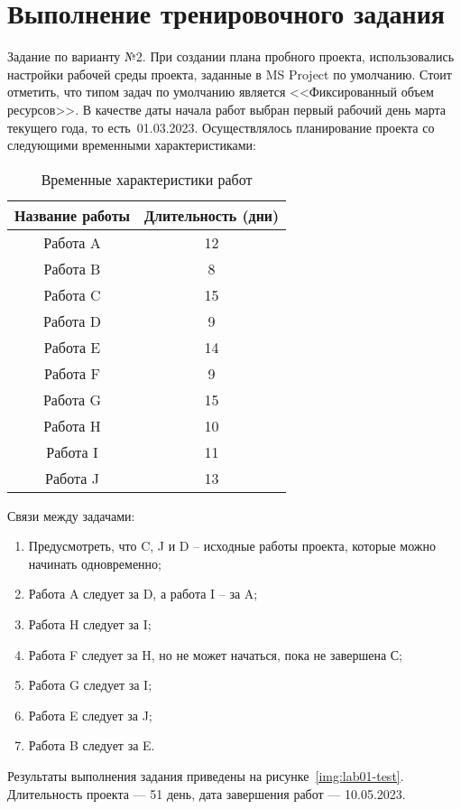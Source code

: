 \section{Выполнение тренировочного задания}

Задание по варианту №2. При создании плана пробного проекта, использовались
настройки рабочей среды проекта, заданные в MS Project по умолчанию.  Стоит
отметить, что типом задач по умолчанию является <<Фиксированный объем
ресурсов>>. В качестве даты начала работ выбран первый рабочий день марта
текущего года, то есть~01.03.2023. Осуществлялось планирование проекта со
следующими временными характеристиками:

{
\captionsetup{format=hang,justification=raggedleft,
              singlelinecheck=off,width=17cm}
\begin{longtable}[Hc]{|c|c|}
\caption{Временные характеристики работ}\\
    \hline
    Название работы & Длительность (дни)\\
    \hline
    Работа A & 12\\
    \hline
    Работа B & 8\\
    \hline
    Работа C & 15\\
    \hline
    Работа D & 9\\
    \hline
    Работа E & 14\\
    \hline
    Работа F & 9\\
    \hline
    Работа G & 15\\
    \hline
    Работа H & 10\\
    \hline
    Работа I & 11\\
    \hline
    Работа J & 13\\
    \hline
\end{longtable}
}

Связи между задачами:

\begin{enumerate}
    \item Предусмотреть, что C, J и D – исходные работы проекта, которые можно начинать одновременно;
    \item Работа A следует за D, а работа I – за A;
    \item Работа H следует за I;
    \item Работа F следует за H, но не может начаться, пока не завершена С;
    \item Работа G следует за I;
    \item Работа E следует за J;
    \item Работа B следует за E.
\end{enumerate}

Результаты выполнения задания приведены на рисунке~\ref{img:lab01-test}.
Длительность проекта --- 51 день, дата завершения работ --- 10.05.2023.


